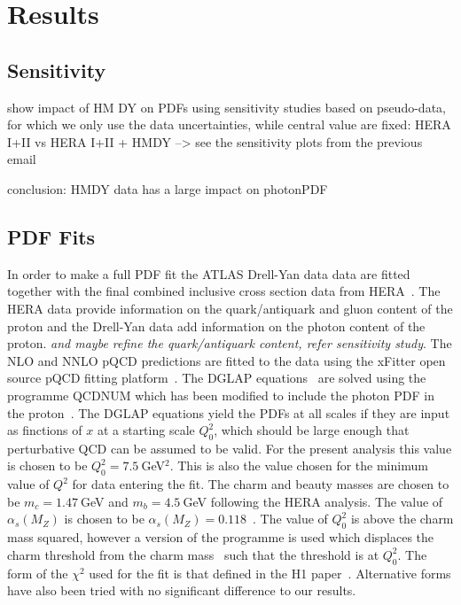 \section{Results}

\subsection{Sensitivity}
 show impact of HM DY on PDFs using sensitivity studies based on
pseudo-data, for which we only use the data uncertainties, while central 
value are fixed:
 HERA I+II vs HERA I+II + HMDY --> see the sensitivity plots from the previous email


conclusion: HMDY data has a large impact on photonPDF 



\subsection{PDF Fits}

In order to make a full PDF fit the  ATLAS Drell-Yan data data are fitted together with the final combined inclusive 
cross section data from HERA~\cite{hera}. The HERA data provide information on the quark/antiquark and gluon content of 
the proton and the Drell-Yan data add information on the photon content of the proton. {\it and maybe refine the quark/antiquark content, refer sensitivity study}.   
The NLO and NNLO pQCD predictions are fitted to the data using the xFitter open source pQCD fitting platform~\cite{xFitter}.
The DGLAP equations~\cite{dglap} are solved using the programme QCDNUM which has been modified to include 
the photon PDF in the proton~\cite{qcdnum}.
The DGLAP equations yield the PDFs at all scales if they are input as finctions of $x$ at a starting scale $Q^2_0$, which 
should be large enough that perturbative QCD can be assumed to be valid. For the present analysis this value is chosen
to be $Q^2_0 = 7.5~$GeV$^2$. This is also the value chosen for the minimum value of $Q^2$ for data entering the fit.
The charm and beauty masses are chosen to be $m_c=1.47~$GeV and $m_b=4.5~$GeV following the HERA analysis. 
The value of $\alpha_s(M_Z)$ is chosen to be $\alpha_s(M_Z)=0.118$~\cite{PDG}. 
The value of $Q^2_0$ is above the charm mass squared, however a version of the programme 
is used which displaces the charm threshold from the charm mass~\cite{charmthresh} such that the threshold is at $Q^2_0$.
The form of the $\chi^2$ used for the fit is that defined in the H1 paper~\cite{h1chisqdef}. 
Alternative forms have also been tried with no significant difference to our results.
 
